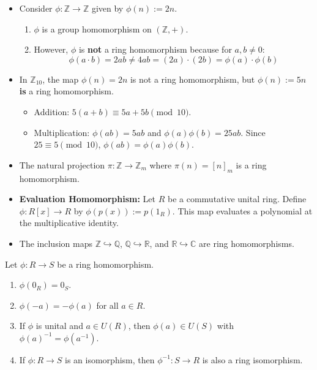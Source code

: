 \begin{example}
\begin{itemize}
    \item Consider $\phi: \mathbb{Z} \to \mathbb{Z}$ given by $\phi(n) := 2n$.
    \begin{enumerate}
        \item $\phi$ is a group homomorphism on $(\mathbb{Z}, +)$.
        \item However, $\phi$ is \textbf{not} a ring homomorphism because for $a, b \neq 0$:
        \[ \phi(a \cdot b) = 2ab \neq 4ab = (2a) \cdot (2b) = \phi(a) \cdot \phi(b) \]
    \end{enumerate} 
    
    \item In $\mathbb{Z}_{10}$, the map $\phi(n) = 2n$ is not a ring homomorphism, but $\phi(n) := 5n$ \textbf{is} a ring homomorphism.
    \begin{itemize}
        \item Addition: $5(a+b) \equiv 5a + 5b \pmod{10}$.
        \item Multiplication: $\phi(ab) = 5ab$ and $\phi(a)\phi(b) = 25ab$. Since $25 \equiv 5 \pmod{10}$, $\phi(ab) = \phi(a)\phi(b)$.
    \end{itemize}

    \item The natural projection $\pi: \mathbb{Z} \to \mathbb{Z}_m$ where $\pi(n) = [n]_m$ is a ring homomorphism.

    \item \textbf{Evaluation Homomorphism:} Let $R$ be a commutative unital ring. Define $\phi: R[x] \to R$ by $\phi(p(x)) := p(1_R)$. This map evaluates a polynomial at the multiplicative identity.
    
    \item The inclusion maps $\mathbb{Z} \hookrightarrow \mathbb{Q}$, $\mathbb{Q} \hookrightarrow \mathbb{R}$, and $\mathbb{R} \hookrightarrow \mathbb{C}$ are ring homomorphisms.
\end{itemize}
\end{example}

\begin{proposition}
Let $\phi: R \to S$ be a ring homomorphism.
\begin{enumerate}
    \item $\phi(0_R) = 0_S$.
    \item $\phi(-a) = -\phi(a)$ for all $a \in R$.
    \item If $\phi$ is unital and $a \in U(R)$, then $\phi(a) \in U(S)$ with $\phi(a)^{-1} = \phi(a^{-1})$.
    \item If $\phi: R \to S$ is an isomorphism, then $\phi^{-1}: S \to R$ is also a ring isomorphism.
\end{enumerate}
\end{proposition}

